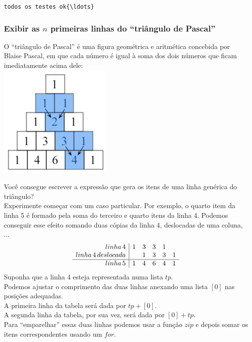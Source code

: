 \documentclass[11pt,a4paper]{article}
\makeatletter
\def\maxwidth{\ifdim\Gin@nat@width>\linewidth\linewidth
    \else\Gin@nat@width\fi}
\let\Oldincludegraphics\includegraphics
\renewcommand{\includegraphics}[1]{\Oldincludegraphics[width=.8\maxwidth]{#1}}
\makeatother
\begin{document}
    \begin{Verbatim}[commandchars=\\\{\}]
todos os testes ok{\ldots}

    \end{Verbatim}

    \subsubsection{\texorpdfstring{Exibir as \(n\) primeiras linhas do
``triângulo de
Pascal''}{Exibir as n primeiras linhas do ``triângulo de Pascal''}}\label{exibir-as-n-primeiras-linhas-do-triuxe2ngulo-de-pascal}

O ``triângulo de Pascal'' é uma figura geométrica e aritmética concebida
por Blaise Pascal, em que cada número é igual à soma dos dois números
que ficam imediatamente acima dele:\\
\includegraphics{../img/Pascal triangle half-size.png}

    Você consegue escrever a expressão que gera os itens de uma linha
genérica do triângulo?\\
Experimente começar com um caso particular. Por exemplo, o quarto item
da linha 5 é formado pela soma do terceiro e quarto itens da linha 4.
Podemos conseguir esse efeito somando duas cópias da linha 4, deslocadas
de uma coluna, ...  
$$
\begin{array}{ r | c  c  c  c  c }
   linha \,4             & 1 & 3 & 3 & 1 &    \\ 
   linha \,4\, deslocada &   & 1 & 3 & 3 & 1  \\ \hline
   linha \,5             & 1 & 4 & 6 & 4 & 1  \\ 
\end{array}
$$
    Suponha que a linha 4 esteja representada numa lista \(\mathit{tp}\).\\
Podemos ajustar o comprimento das duas linhas anexando uma lista \([0]\)
nas posições adequadas.\\
A primeira linha da tabela será dada por \(\mathit{tp} + [0]\).\\
A segunda linha da tabela, por sua vez, será dada por
\([0] + \mathit{tp}\).\\
Para ``emparelhar'' essas duas linhas podemos usar a função
\(\mathit{zip}\) e depois somar os itens correspondentes usando um
\(\mathit{for}\).
\end{document}
